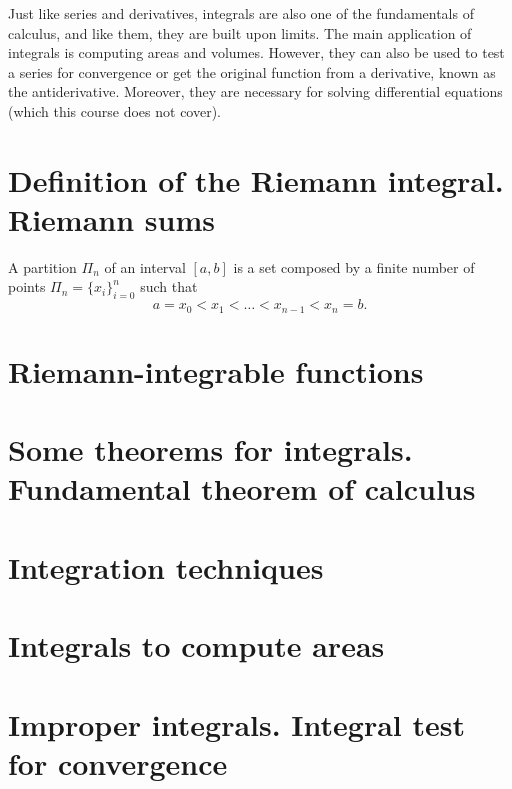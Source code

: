 
Just like series and derivatives, integrals are also one of the fundamentals of calculus, and like them,
they are built upon limits. The main application of integrals is computing areas and volumes. However,
they can also be used to test a series for convergence or get the original function from a derivative, known
as the antiderivative. Moreover, they are necessary for solving differential equations (which this course
does not cover).

\section{Definition of the Riemann integral. Riemann sums}
\begin{defi}[Partition]
    A partition $\Pi_n$ of an interval $[a, b]$ is a set composed by a finite number of points $\Pi_n = \{
    x_i\}_{i=0}^n$ such that
    \begin{equation}
        a = x_0 < x_1 < \ldots < x_{n - 1} < x_n = b.
    \end{equation}
\end{defi}


\section{Riemann-integrable functions}

\section{Some theorems for integrals. Fundamental theorem of calculus}

\section{Integration techniques}

\section{Integrals to compute areas}

\section{Improper integrals. Integral test for convergence}
